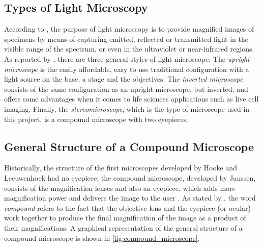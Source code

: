 \subsection{Types of Light Microscopy}

According to , the purpose of light microscopy is to provide magnified images of specimens by means of capturing emitted, reflected or transmitted light in the visible range of the spectrum, or even in the ultraviolet or near-infrared regions. As reported by , there are three general styles of light microscope. The \emph{upright microscope} is the easily affordable, easy to use traditional configuration with a light source on the base, a stage and the objectives. The \emph{inverted microscope} consists of the same configuration as an upright microscope, but inverted, and offers some advantages when it comes to life sciences applications such as live cell imaging. Finally, the \emph{stereomicroscope}, which is the type of microscope used in this project, is a compound microscope with two eyepieces.

\subsection{General Structure of a Compound Microscope}

Historically, the structure of the first microscopes developed by Hooke and Leeuwenhoek had no eyepiece; the compound microscope, developed by Janssen, consists of the magnification lenses and also an eyepiece, which adds more magnification power and delivers the image to the user \cite{lawlor2019introduction}. As stated by , the word \emph{compound} refers to the fact that the objective lens and the eyepiece (or ocular) work together to produce the final magnification of the image as a product of their magnifications. A graphical representation of the general structure of a compound microscope is shown in \autoref{fig:compound_microscope}.

